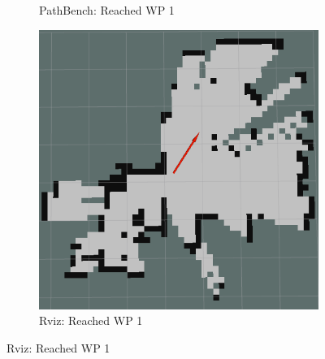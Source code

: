 \begin{figure}[h!]
\begin{subfigure}[b]{0.32\linewidth}
     \caption{PathBench: Reached WP 1}
  \end{subfigure}
  \hfill
  \begin{subfigure}[b]{0.32\linewidth}
    \includegraphics[width=\linewidth]{images/real/sys/2_3.png}
     \caption{Rviz: Reached WP 1}
  \end{subfigure}
  
  \newline
  

\end{figure}
